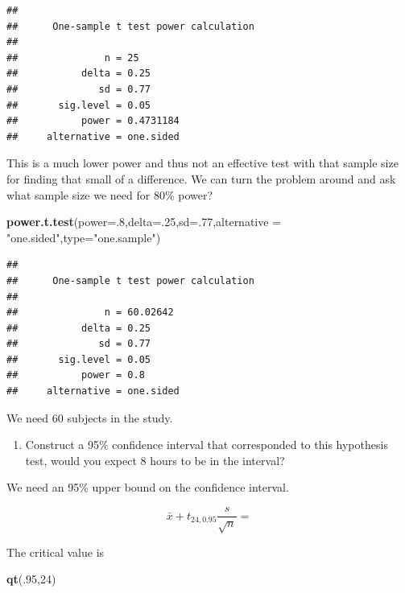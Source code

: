 \documentclass[
]{book}
\newenvironment{Shaded}{\begin{snugshade}}{\end{snugshade}}
\newcommand{\DataTypeTok}[1]{\textcolor[rgb]{0.13,0.29,0.53}{#1}}
\newcommand{\DecValTok}[1]{\textcolor[rgb]{0.00,0.00,0.81}{#1}}
\newcommand{\KeywordTok}[1]{\textcolor[rgb]{0.13,0.29,0.53}{\textbf{#1}}}
\newcommand{\NormalTok}[1]{#1}
\newcommand{\StringTok}[1]{\textcolor[rgb]{0.31,0.60,0.02}{#1}}
\providecommand{\tightlist}{%
  \setlength{\itemsep}{0pt}\setlength{\parskip}{0pt}}
\begin{document}
\begin{verbatim}
## 
##      One-sample t test power calculation 
## 
##               n = 25
##           delta = 0.25
##              sd = 0.77
##       sig.level = 0.05
##           power = 0.4731184
##     alternative = one.sided
\end{verbatim}

This is a much lower power and thus not an effective test with that sample size for finding that small of a difference. We can turn the problem around and ask what sample size we need for 80\% power?

\begin{Shaded}
\begin{Highlighting}[]
\KeywordTok{power.t.test}\NormalTok{(}\DataTypeTok{power=}\NormalTok{.}\DecValTok{8}\NormalTok{,}\DataTypeTok{delta=}\NormalTok{.}\DecValTok{25}\NormalTok{,}\DataTypeTok{sd=}\NormalTok{.}\DecValTok{77}\NormalTok{,}\DataTypeTok{alternative =} \StringTok{"one.sided"}\NormalTok{,}\DataTypeTok{type=}\StringTok{"one.sample"}\NormalTok{)}
\end{Highlighting}
\end{Shaded}

\begin{verbatim}
## 
##      One-sample t test power calculation 
## 
##               n = 60.02642
##           delta = 0.25
##              sd = 0.77
##       sig.level = 0.05
##           power = 0.8
##     alternative = one.sided
\end{verbatim}

We need 60 subjects in the study.

\begin{enumerate}
\def\labelenumi{\alph{enumi}.}
\setcounter{enumi}{4}
\tightlist
\item
  Construct a 95\% confidence interval that corresponded to this hypothesis test, would you expect 8 hours to be in the interval?
\end{enumerate}

We need an 95\% upper bound on the confidence interval.

\[\bar{x} + t_{24,0.95}{\frac{s}{\sqrt{n}}}  = \]

The critical value is

\begin{Shaded}
\begin{Highlighting}[]
\KeywordTok{qt}\NormalTok{(.}\DecValTok{95}\NormalTok{,}\DecValTok{24}\NormalTok{)}
\end{Highlighting}
\end{Shaded}
\end{document}
